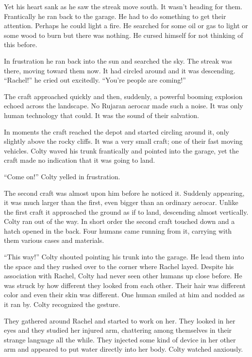 Yet his heart sank as he saw the streak move south. It wasn't heading for them. Frantically he
ran back to the garage. He had to do something to get their attention. Perhaps he could light a
fire. He searched for some oil or gas to light or some wood to burn but there was nothing. He
cursed himself for not thinking of this before.

In frustration he ran back into the sun and searched the sky. The streak was there, moving
toward them now. It had circled around and it was descending. ``Rachel!'' he cried out
excitedly. ``You're people are coming!''

The craft approached quickly and then, suddenly, a powerful booming explosion echoed across the
landscape. No Rujaran aerocar made such a noise. It was only human technology that could. It
was the sound of their salvation.

In moments the craft reached the depot and started circling around it, only slightly above the
rocky cliffs. It was a very small craft; one of their fast moving vehicles. Colty waved his
trunk frantically and pointed into the garage, yet the craft made no indication that it was
going to land.

``Come on!'' Colty yelled in frustration.

The second craft was almost upon him before he noticed it. Suddenly appearing, it was much
larger than the first, even bigger than an ordinary aerocar. Unlike the first craft it
approached the ground as if to land, descending almost vertically. Colty ran out of the way. In
short order the second craft touched down and a hatch opened in the back. Four humans came
running from it, carrying with them various cases and materials.

``This way!'' Colty shouted pointing his trunk into the garage. He lead them into the space and
they rushed over to the corner where Rachel layed. Despite his association with Rachel, Colty
had never seen other humans up close before. He was struck by how different they looked from
each other. Their hair was different color and even their skin was different. One human smiled
at him and nodded as it ran by. Colty recognized the gesture.

They gathered around Rachel and started to work on her. They looked in her eyes and they studied
her injured arm, chattering among themselves in their strange language all the while. They
injected some kind of device in her other arm and appeared to put water directly into her body.
Colty watched anxiously.

